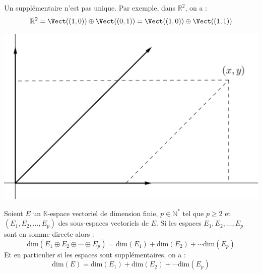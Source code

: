 \documentclass[french,11pt,twoside]{VcCours}
\begin{document}
\begin{Remarque}{} 
	\warning{} Un supplémentaire n'est pas unique. 
	Par exemple, dans $\mathbb{R}^2$, on a :
$$ \mathbb{R}^2 = \Vect((1,0)) \oplus \Vect((0,1)) = \Vect((1,0)) \oplus \Vect((1,1))$$

\medskip


\begin{center}
\includegraphics[scale=0.3]{Supp}
\end{center}
\end{Remarque}

\begin{Proposition}{} 
Soient $E$ un $\mathbb{K}$-espace vectoriel de dimension finie, $p \in \mathbb{N}^*$ tel que $p \geq 2$ et $(E_1, E_2, \ldots, E_p)$ des sous-espaces vectoriels de $E$. Si les espaces $E_1, E_2, \ldots, E_p$ sont en somme directe alors :
$$ \textrm{dim}(E_1 \oplus E_2 \oplus \cdots \oplus E_p) =\textrm{dim}(E_1) + \textrm{dim}(E_2) + \cdots \textrm{dim}(E_p)$$
Et en particulier si les espaces sont supplémentaires, on a :
$$ \textrm{dim}(E) = \textrm{dim}(E_1) + \textrm{dim}(E_2) + \cdots \textrm{dim}(E_p)$$
\end{Proposition}

\begin{Demonstration}{} 

\vspace{6cm}
\end{Demonstration}
\end{document}
